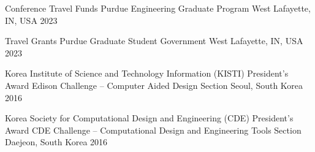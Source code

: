 

\begin{cvhonors}

\cvhonor
{Conference Travel Funds} %
{Purdue Engineering Graduate Program} %
{West Lafayette, IN, USA} %
{2023} %

\cvhonor
{Travel Grants} %
{Purdue Graduate Student Government} %
{West Lafayette, IN, USA} %
{2023} %

\cvhonor
{Korea Institute of Science and Technology Information (KISTI)  President’s Award} %
{Edison Challenge –  Computer Aided Design Section} %
{Seoul, South Korea} %
{2016} %


\cvhonor
{Korea Society for Computational Design and Engineering (CDE) President’s Award} %
{CDE Challenge – Computational Design and Engineering Tools Section} %
{Daejeon, South Korea} %
{2016} %


\end{cvhonors}
